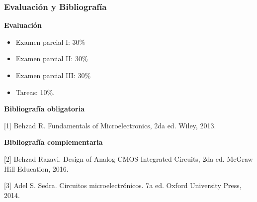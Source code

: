 \begin{frame}[t]
\frametitle{Evaluación y Bibliografía}
\textbf{Evaluación} 

\begin{itemize}
	\item Examen parcial I: 30\%
	\item Examen parcial II: 30\%
	\item Examen parcial III: 30\%
	\item Tareas: 10\%.		
\end{itemize}

\vspace{5mm}
\textbf{Bibliografía obligatoria}

[1] Behzad R. Fundamentals of Microelectronics, 2da ed. Wiley, 2013.

\vspace{5mm}
\textbf{Bibliografía complementaria}

[2] Behzad Razavi. Design of Analog CMOS Integrated Circuits, 2da ed. McGraw Hill Education, 2016.

[3] Adel S. Sedra. Circuitos microelectrónicos. 7a ed. Oxford University Press, 2014.

\end{frame}

